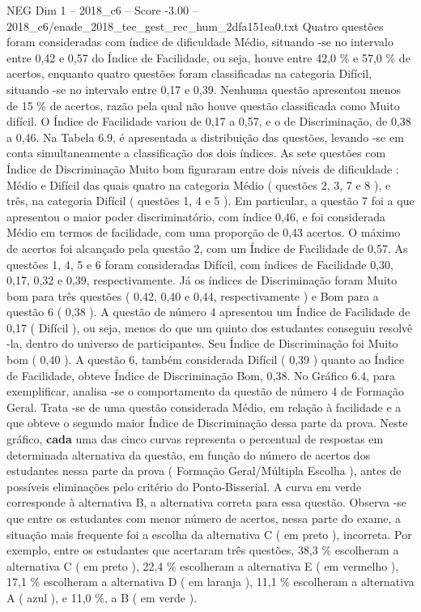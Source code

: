 \begin{textsample}{NEG Dim 1 – 2018\_c6 – Score -3.00 – 2018\_c6/enade\_2018\_tec\_gest\_rec\_hum\_2dfa151ea0.txt}
Quatro questões foram consideradas com índice de dificuldade Médio, situando -se no intervalo entre 0,42 e 0,57 do Índice de Facilidade, ou seja, houve entre 42,0 \% e 57,0 \% de acertos, enquanto quatro questões foram classificadas na categoria Difícil, situando -se no intervalo entre 0,17 e 0,39.
Nenhuma questão apresentou menos de 15 \% de acertos, razão pela qual não houve questão classificada como Muito difícil.
O Índice de Facilidade variou de 0,17 a 0,57, e o de Discriminação, de 0,38 a 0,46.
Na Tabela 6.9, é apresentada a distribuição das questões, levando -se em conta simultaneamente a classificação dos dois índices.
As sete questões com Índice de Discriminação Muito bom figuraram entre dois níveis de dificuldade : Médio e Difícil das quais quatro na categoria Médio ( questões 2, 3, 7 e 8 ), e três, na categoria Difícil ( questões 1, 4 e 5 ).
Em particular, a questão 7 foi a que apresentou o maior poder discriminatório, com índice 0,46, e foi considerada Médio em termos de facilidade, com uma proporção de 0,43 acertos.
O máximo de acertos foi alcançado pela questão 2, com um Índice de Facilidade de 0,57.
As questões 1, 4, 5 e 6 foram consideradas Difícil, com índices de Facilidade 0,30, 0,17, 0,32 e 0,39, respectivamente.
Já os índices de Discriminação foram Muito bom para três questões ( 0,42, 0,40 e 0,44, respectivamente ) e Bom para a questão 6 ( 0,38 ).
A questão de número 4 apresentou um Índice de Facilidade de 0,17 ( Difícil ), ou seja, menos do que um quinto dos estudantes conseguiu resolvê -la, dentro do universo de participantes.
Seu Índice de Discriminação foi Muito bom ( 0,40 ).
A questão 6, também considerada Difícil ( 0,39 ) quanto ao Índice de Facilidade, obteve Índice de Discriminação Bom, 0,38.
No Gráfico 6.4, para exemplificar, analisa -se o comportamento da questão de número 4 de Formação Geral.
Trata -se de uma questão considerada Médio, em relação à facilidade e a que obteve o segundo maior Índice de Discriminação dessa parte da prova.
Neste gráfico, \textbf{cada} uma das cinco curvas representa o percentual de respostas em determinada alternativa da questão, em função do número de acertos dos estudantes nessa parte da prova ( Formação Geral/Múltipla Escolha ), antes de possíveis eliminações pelo critério do Ponto-Bisserial.
A curva em verde corresponde à alternativa B, a alternativa correta para essa questão.
Observa -se que entre os estudantes com menor número de acertos, nessa parte do exame, a situação mais frequente foi a escolha da alternativa C ( em preto ), incorreta.
Por exemplo, entre os estudantes que acertaram três questões, 38,3 \% escolheram a alternativa C ( em preto ), 22,4 \% escolheram a alternativa E ( em vermelho ), 17,1 \% escolheram a alternativa D ( em laranja ), 11,1 \% escolheram a alternativa A ( azul ), e 11,0 \%, a B ( em verde ).

\end{textsample}
